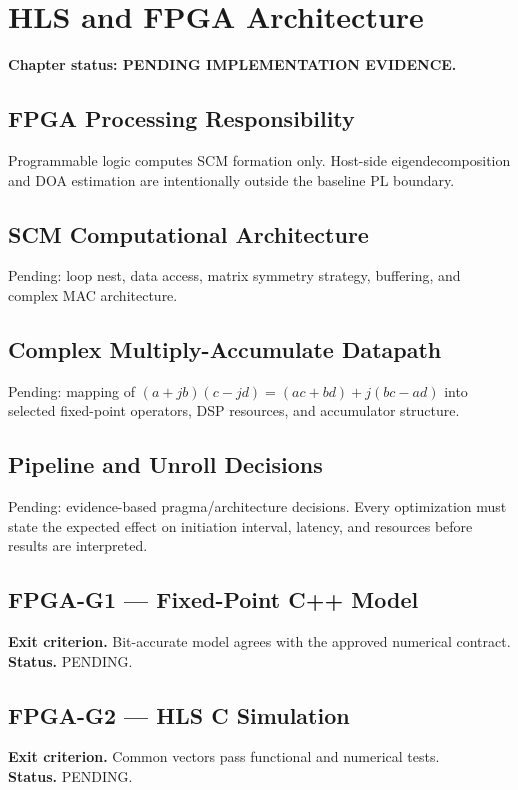 \chapter{HLS and FPGA Architecture}
\label{ch:hls-fpga}
\textbf{Chapter status: PENDING IMPLEMENTATION EVIDENCE.}

\section{FPGA Processing Responsibility}
Programmable logic computes SCM formation only. Host-side eigendecomposition and DOA
estimation are intentionally outside the baseline PL boundary.

\section{SCM Computational Architecture}
Pending: loop nest, data access, matrix symmetry strategy, buffering, and complex MAC
architecture.

\section{Complex Multiply-Accumulate Datapath}
Pending: mapping of $(a+jb)(c-jd)=(ac+bd)+j(bc-ad)$ into selected fixed-point operators,
DSP resources, and accumulator structure.

\section{Pipeline and Unroll Decisions}
Pending: evidence-based pragma/architecture decisions. Every optimization must state the
expected effect on initiation interval, latency, and resources before results are interpreted.

\section{FPGA-G1 --- Fixed-Point C++ Model}
\textbf{Exit criterion.} Bit-accurate model agrees with the approved numerical contract.\\
\textbf{Status.} PENDING.

\section{FPGA-G2 --- HLS C Simulation}
\textbf{Exit criterion.} Common vectors pass functional and numerical tests.\\
\textbf{Status.} PENDING.

